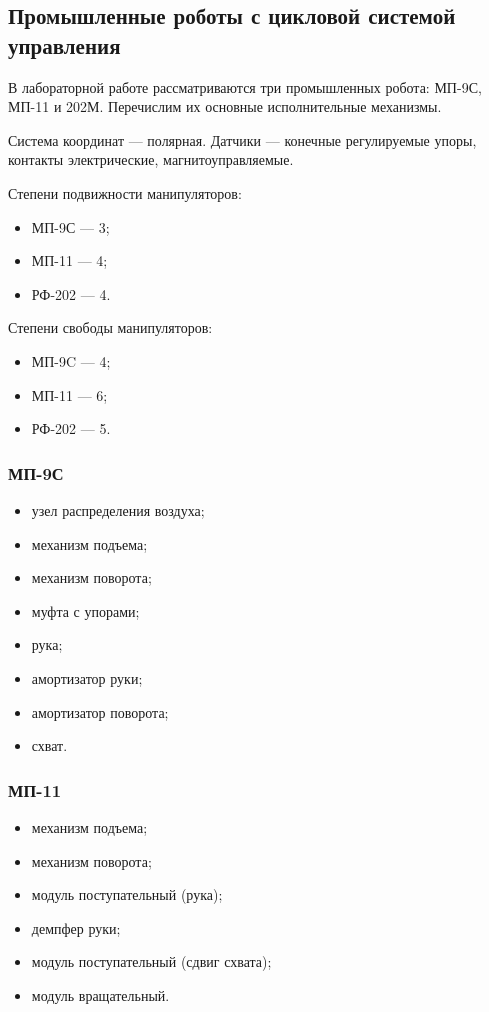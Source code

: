 \subsection*{Промышленные роботы с цикловой системой управления}

В лабораторной работе рассматриваются три промышленных робота: МП-9С, МП-11 и 202М. Перечислим их основные исполнительные механизмы.

Система координат --- полярная. Датчики --- конечные регулируемые упоры, контакты электрические, магнитоуправляемые.

Степени подвижности манипуляторов:

\begin{itemize}
    \item МП-9С --- 3;
    \item МП-11 --- 4;
    \item РФ-202 --- 4.
\end{itemize}

Степени свободы манипуляторов:

\begin{itemize}
    \item МП-9C --- 4;
    \item МП-11 --- 6;
    \item РФ-202 --- 5.
\end{itemize}

\subsubsection*{МП-9С}

\begin{itemize}
    \item узел распределения воздуха;
    \item механизм подъема;
    \item механизм поворота;
    \item муфта с упорами;
    \item рука;
    \item амортизатор руки;
    \item амортизатор поворота;
    \item схват.
\end{itemize}

\subsubsection*{МП-11}

\begin{itemize}
    \item механизм подъема;
    \item механизм поворота;
    \item модуль поступательный (рука);
    \item демпфер руки;
    \item модуль поступательный (сдвиг схвата);
    \item модуль вращательный.
\end{itemize}

